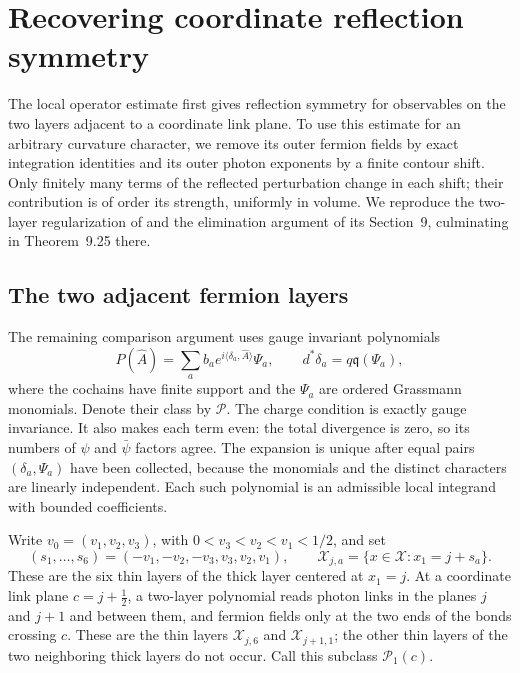 \documentclass[11pt,letterpaper,reqno]{amsart}
\begin{document}
\section{Recovering coordinate reflection symmetry}\label{sec:coordinate-symmetry}

The local operator estimate first gives reflection symmetry for
observables on the two layers adjacent to a coordinate link plane.
To use this estimate for an arbitrary curvature character, we remove
its outer fermion fields by exact integration identities and its
outer photon exponents by a finite contour shift. Only finitely many
terms of the reflected perturbation change in each shift; their
contribution is of order its strength, uniformly in volume. We reproduce
the two-layer regularization of \cite[Sections~8.9--8.10]{ChamberQED}
and the elimination argument of its Section~9, culminating in
Theorem~9.25 there.

\subsection{The two adjacent fermion layers}\label{subsec:diag-two-layers}

The remaining comparison argument uses gauge invariant polynomials
\[
 P(\widehat A)=\sum_a b_a e^{i\langle\delta_a,\widehat A\rangle}
                                     \Psi_a,\qquad
 d^*\delta_a=q\mathfrak q(\Psi_a),
\]
where the cochains have finite support and the $\Psi_a$ are ordered
Grassmann monomials. Denote their class by $\mathcal P$. The charge
condition is exactly gauge invariance. It also makes each term
even: the total divergence is zero, so its numbers of $\psi$ and
$\bar\psi$ factors agree. The expansion is unique after equal
pairs $(\delta_a,\Psi_a)$ have been collected, because the monomials
and the distinct characters are linearly independent. Each such
polynomial is an admissible local integrand with bounded coefficients.

Write $v_0=(v_1,v_2,v_3)$, with $0<v_3<v_2<v_1<1/2$, and set
\[
 (s_1,\ldots,s_6)=(-v_1,-v_2,-v_3,v_3,v_2,v_1),\qquad
 \mathcal X_{j,a}=\{x\in\mathcal X:x_1=j+s_a\}.
\]
These are the six thin layers of the thick layer centered at $x_1=j$.
At a coordinate link plane $c=j+\tfrac12$, a two-layer polynomial
reads photon links in the planes $j$ and $j+1$ and between them,
and fermion fields only at the two ends of the bonds crossing
$c$. These are the thin layers $\mathcal X_{j,6}$ and
$\mathcal X_{j+1,1}$; the other thin layers of the two neighboring thick layers do
not occur. Call this subclass $\mathcal P_1(c)$.
\end{document}
